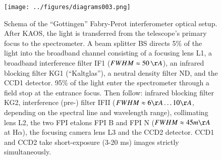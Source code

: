 \begin{figure}[t]
\begin{center}
\texttt{[image: ../figures/diagrams003.png]}
\caption{Schema of the ``Gottingen'' Fabry-Perot interferometer optical setup. After KAOS, the light is transferred from the telescope's primary focus to the spectrometer. A beam splitter BS directs 5\% of the light into the broadband channel consisting of a focusing lens L1, a broadband interference filter IF1 ($FWHM \approx 50\,\AA$), an infrared blocking filter KG1 (``Kaltglas''), a neutral density filter ND, and the CCD1 detector. 95\% of the light enter the spectrometer through a field stop at the entrance focus. Then follow: infrared blocking filter KG2, interference (pre-) filter IFII ($FWHM \approx 6 \AA\dots10\AA$, depending on the spectral line and wavelength range), collimating lens L2, the two FPI etalons FPI B and FPI N ($FWHM \approx 45 m\AA$ at H$\alpha$), the focusing camera lens L3 and the CCD2 detector. CCD1 and CCD2 take short-exposure (3-20 ms) images strictly simultaneously.}
\label{fig:gfpi:optical}
\end{center}
\end{figure}


